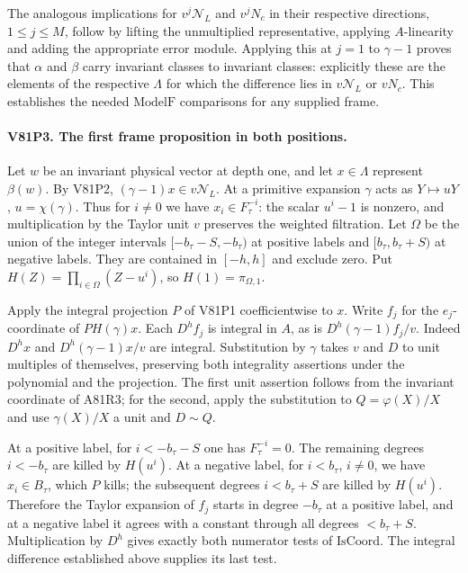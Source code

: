 The analogous implications for $v^j\mathcal N_L$ and $v^jN_c$
in their respective directions, $1\le j\le M$, follow by lifting
the unmultiplied representative, applying $A$-linearity and adding
the appropriate error module. Applying this at $j=1$ to
$\gamma-1$ proves that $\alpha$ and $\beta$ carry invariant
classes to invariant classes: explicitly these are the elements
of the respective $\Lambda$ for which the difference lies in
$v\mathcal N_L$ or $vN_c$. This establishes the needed
$\mathrm{ModelF}$ comparisons for any supplied frame.

\paragraph{V81P3. The first frame proposition in both positions.}
Let $w$ be an invariant physical vector at depth one, and let
$x\in\Lambda$ represent $\beta(w)$. By V81P2,
$(\gamma-1)x\in v\mathcal N_L$. At a primitive expansion
$\gamma$ acts as $Y\mapsto uY$, $u=\chi(\gamma)$.
Thus for $i\ne0$ we have $x_i\in F_\tau^{-i}$: the scalar
$u^i-1$ is nonzero, and multiplication by the Taylor unit $v$
preserves the weighted filtration. Let $\Omega$ be the union of
the integer intervals $[-b_\tau-S,-b_\tau)$ at positive labels
and $[b_\tau,b_\tau+S)$ at negative labels. They are contained
in $[-h,h]$ and exclude zero. Put
$H(Z)=\prod_{i\in\Omega}(Z-u^i)$, so $H(1)=\pi_{\Omega,1}$.

Apply the integral projection $P$ of V81P1 coefficientwise to $x$.
Write $f_j$ for the $e_j$-coordinate of $P H(\gamma)x$.
Each $D^hf_j$ is integral in $A$, as is
$D^h(\gamma-1)f_j/v$. Indeed $D^h x$ and
$D^h(\gamma-1)x/v$ are integral. Substitution by $\gamma$ takes
$v$ and $D$ to unit multiples of themselves, preserving both
integrality assertions under the polynomial and the projection.
The first unit assertion follows from the invariant coordinate of
A81R3; for the second, apply the substitution to $Q=\varphi(X)/X$
and use $\gamma(X)/X$ a unit and $D\sim Q$.

At a positive label, for $i<-b_\tau-S$ one has
$F_\tau^{-i}=0$. The remaining degrees $i<-b_\tau$ are killed
by $H(u^i)$. At a negative label, for $i<b_\tau$, $i\ne0$,
we have $x_i\in B_\tau$, which $P$ kills; the subsequent degrees
$i<b_\tau+S$ are killed by $H(u^i)$. Therefore the Taylor
expansion of $f_j$ starts in degree $-b_\tau$ at a positive
label, and at a negative label it agrees with a constant through
all degrees $<b_\tau+S$. Multiplication by $D^h$ gives exactly
both numerator tests of $\mathrm{IsCoord}$. The integral
difference established above supplies its last test.

